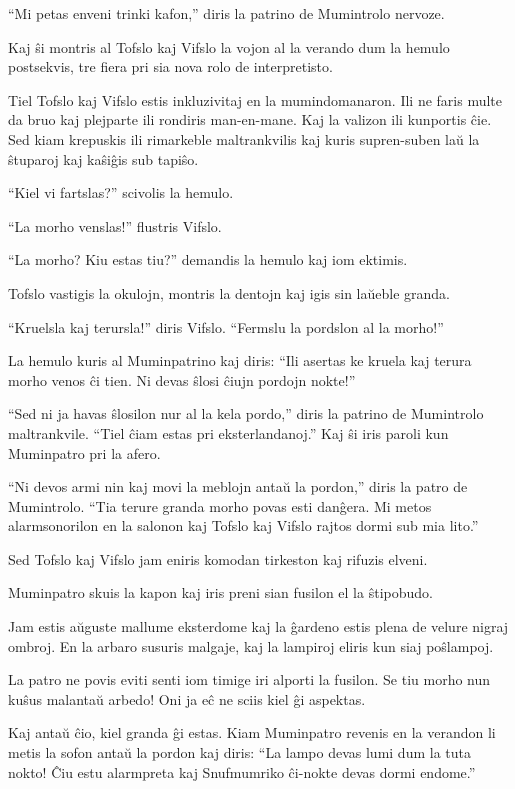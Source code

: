 ``Mi petas enveni trinki kafon,'' diris la patrino de Mumintrolo nervoze.

Kaj ŝi montris al Tofslo kaj Vifslo la vojon al la verando dum la hemulo postsekvis, tre fiera pri sia nova rolo de interpretisto.
\sectionbreak

Tiel Tofslo kaj Vifslo estis inkluzivitaj en la mumindomanaron. Ili ne faris multe da bruo kaj plejparte ili rondiris man-en-mane. Kaj la valizon ili kunportis ĉie. Sed kiam krepuskis ili rimarkeble maltrankvilis kaj kuris supren-suben laŭ la ŝtuparoj kaj kaŝiĝis sub tapiŝo.

``Kiel vi fartslas?'' scivolis la hemulo.

``La morho venslas!'' flustris Vifslo.

``La morho? Kiu estas tiu?'' demandis la hemulo kaj iom ektimis.

Tofslo vastigis la okulojn, montris la dentojn kaj igis sin laŭeble granda.

``Kruelsla kaj terursla!'' diris Vifslo. ``Fermslu la pordslon al la morho!''

La hemulo kuris al Muminpatrino kaj diris: ``Ili asertas ke kruela kaj terura morho venos ĉi tien. Ni devas ŝlosi ĉiujn pordojn nokte!''

``Sed ni ja havas ŝlosilon nur al la kela pordo,'' diris la patrino de Mumintrolo maltrankvile. ``Tiel ĉiam estas pri eksterlandanoj.'' Kaj ŝi iris paroli kun Muminpatro pri la afero.

``Ni devos armi nin kaj movi la meblojn antaŭ la pordon,'' diris la patro de Mumintrolo. ``Tia terure granda morho povas esti danĝera. Mi metos alarmsonorilon en la salonon kaj Tofslo kaj Vifslo rajtos dormi sub mia lito.''

Sed Tofslo kaj Vifslo jam eniris komodan tirkeston kaj rifuzis elveni.

Muminpatro skuis la kapon kaj iris preni sian fusilon el la ŝtipobudo.

Jam estis aŭguste mallume eksterdome kaj la ĝardeno estis plena de velure nigraj ombroj. En la arbaro susuris malgaje, kaj la lampiroj eliris kun siaj poŝlampoj.

La patro ne povis eviti senti iom timige iri alporti la fusilon. Se tiu morho nun kuŝus malantaŭ arbedo! Oni ja eĉ ne sciis kiel ĝi aspektas.

Kaj antaŭ ĉio, kiel granda ĝi estas. Kiam Muminpatro revenis en la verandon li metis la sofon antaŭ la pordon kaj diris: ``La lampo devas lumi dum la tuta nokto! Ĉiu estu alarmpreta kaj Snufmumriko ĉi-nokte devas dormi endome.''

